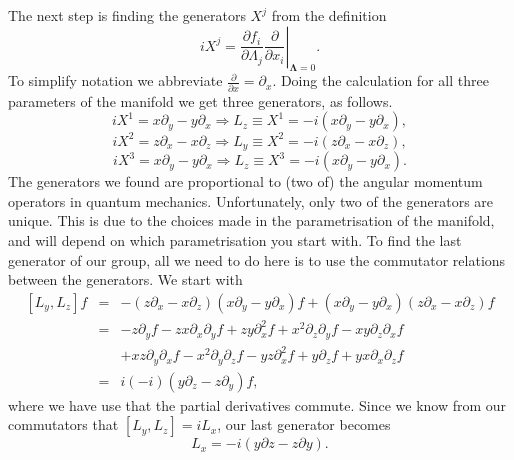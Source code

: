 \documentclass[notes.tex]{subfiles}
\begin{document}
\begin{Answer}
The next step is finding the generators $X^j$ from the definition
$$iX^j = \left.\frac{\partial f_i}{\partial\Lambda_j}\frac{\partial}{\partial x_i}\right|_{\boldsymbol\Lambda = 0}.$$
To simplify notation we abbreviate $\frac{\partial}{\partial x} =\partial_x$. Doing the calculation for all three parameters of the manifold we get three generators, as follows. 
$$iX^1 = x\partial_y-y\partial_x \Rightarrow L_z\equiv X^1 = -i(x\partial_y-y\partial_x),$$
$$iX^2 = z\partial_x-x\partial_z \Rightarrow L_y\equiv X^2 = -i(z\partial_x-x\partial_z),$$
$$iX^3 = x\partial_y-y\partial_x \Rightarrow L_z\equiv X^3 = -i(x\partial_y-y\partial_x).$$
The generators we found are proportional to (two of) the angular momentum operators in quantum mechanics.
Unfortunately, only two of the generators are unique. This is due to the choices made in the parametrisation of the manifold, and will depend on which parametrisation you start with. To find the last generator of our group, all we need to do here is to use the commutator relations between the generators. We start with
\begin{eqnarray*}
\left[L_y,L_z\right]f &=& -(z\partial_x-x\partial_z)(x\partial_y-y\partial_x)f + (x\partial_y-y\partial_x)(z\partial_x-x\partial_z)f \\
&=& -z\partial_y f -zx\partial_x\partial_y f + zy\partial_x^2 f+x^2\partial_z\partial_y f - xy\partial_z\partial_x f \\
&&+ xz\partial_y\partial_x f-x^2\partial_y\partial_z f-yz\partial_x^2 f+y\partial_zf+yx\partial_x\partial_z f \\
&=& i(-i)(y\partial_z-z\partial_y)f,
\end{eqnarray*}
where we have use that the partial derivatives commute. Since we know from our commutators that $\left[L_y,L_z\right]=iL_x$, our last generator becomes $$L_x=-i(y\partial z-z\partial y).$$
\end{Answer}
\end{document}
